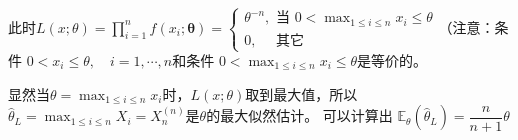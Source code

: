 \begin{enumerate}[1)]
	此时$ L(x ; \theta)=\prod_{i=1}^{n} f\left(x_{i} ; \boldsymbol{\theta} \right)=\left\{
        \begin{array}{l}
		\theta^{-n}, \text { 当 } \displaystyle 0<  \max_{1 \leq i \leq n} x_{i} \leq \theta \\
		0, \quad \text { 其它 }
	\end{array}\right. $（注意：条件 $ 0<x_{i} \leqslant \theta, \quad i=1, \cdots, n $和条件
	$0 < \displaystyle \max _{1 \leq i \leq n} x_{i} \leq \theta  $是等价的。
	
	显然当$ \theta= \displaystyle \max_{1 \leq i \leq n} x_{i} $时，$ L(x;\theta)$取到最大值，所以
	  $ \hat{\theta}_{L}= \displaystyle \max _{1 \leq i \leq n} X_{i}=X_{n}^{(n)} $是$ \theta $的最大似然估计。
	 可以计算出 $ \mathbb{E}_{\theta}\left(\hat{\theta}_{L}\right)=\dfrac{n}{n+1} \theta $
	
\end{enumerate}
